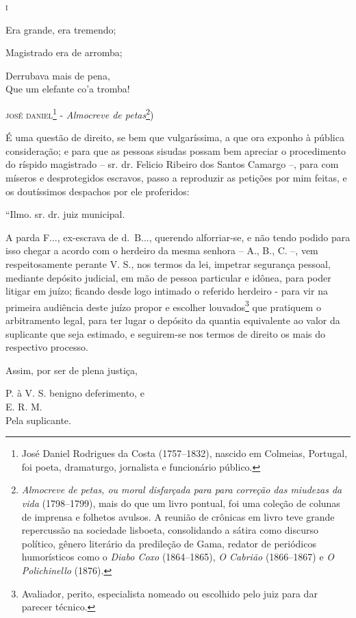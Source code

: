 {\asterisc{}

\textsc{i}

Era grande, era tremendo;

Magistrado era de arromba;

Derrubava mais de pena,\\
Que um elefante co'a tromba!

\textsc{josé daniel}\footnote{ José Daniel Rodrigues da Costa (1757--1832),
  nascido em Colmeias, Portugal, foi poeta, dramaturgo, jornalista e
  funcionário público.} - \emph{Almocreve de petas}\footnote{
  \emph{Almocreve de petas, ou moral disfarçada para para correção das
  miudezas da vida} (1798--1799), mais do que um livro pontual, foi uma
  coleção de colunas de imprensa e folhetos avulsos. A reunião de
  crônicas em livro teve grande repercussão na sociedade lisboeta,
  consolidando a sátira como discurso político, gênero literário da
  predileção de Gama, redator de periódicos humorísticos como o
  \emph{Diabo Coxo} (1864--1865), \emph{O Cabrião} (1866--1867) e \emph{O
  Polichinello} (1876).})

É uma questão de direito, se bem que vulgaríssima, a que ora exponho à
pública consideração; e para que as pessoas sisudas possam bem apreciar
o procedimento do ríspido magistrado -- sr. dr. Felicio Ribeiro dos
Santos Camargo --, para com míseros e desprotegidos escravos, passo a
reproduzir as petições por mim feitas, e os doutíssimos despachos por
ele proferidos:

``Ilmo. sr. dr. juiz municipal.

A parda F..., ex-escrava de d.~B..., querendo alforriar-se, e não tendo
podido para isso chegar a acordo com o herdeiro da mesma senhora -- A.,
B., C. --, vem respeitosamente perante V. S., nos termos da lei,
impetrar segurança pessoal, mediante depósito judicial, em mão de pessoa
particular e idônea, para poder litigar em juízo; ficando desde logo
intimado o referido herdeiro - para vir na primeira audiência deste
juízo propor e escolher louvados\footnote{ Avaliador, perito,
  especialista nomeado ou escolhido pelo juiz para dar parecer técnico.}
que pratiquem o arbitramento legal, para ter lugar o depósito da quantia
equivalente ao valor da suplicante que seja estimado, e seguirem-se nos
termos de direito os mais do respectivo processo.

Assim, por ser de plena justiça,

P. à V. S. benigno deferimento, e\\
E. R. M.\\
Pela suplicante.

}
